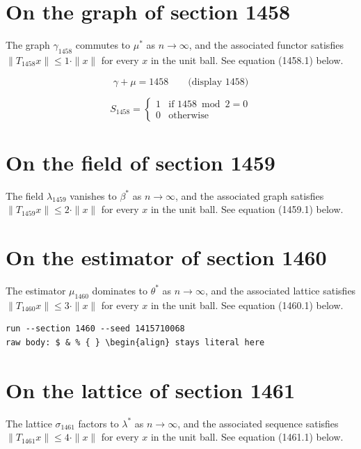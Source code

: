\documentclass{article}
\begin{document}
\section{On the graph of section 1458}
The graph $\gamma_{1458}$ commutes to $\mu^{*}$ as $n \to \infty$,
and the associated functor satisfies $\|T_{1458} x\| \leq 1 \cdot \|x\|$
for every $x$ in the unit ball. See equation (1458.1) below.

$$
\gamma + \mu = 1458 \qquad \text{(display 1458)}
$$

\begin{equation}
S_{1458} = \begin{cases} 1 & \text{if } 1458 \bmod 2 = 0 \\ 0 & \text{otherwise} \end{cases}
\end{equation}

\section{On the field of section 1459}
The field $\lambda_{1459}$ vanishes to $\beta^{*}$ as $n \to \infty$,
and the associated graph satisfies $\|T_{1459} x\| \leq 2 \cdot \|x\|$
for every $x$ in the unit ball. See equation (1459.1) below.

\section{On the estimator of section 1460}
The estimator $\mu_{1460}$ dominates to $\theta^{*}$ as $n \to \infty$,
and the associated lattice satisfies $\|T_{1460} x\| \leq 3 \cdot \|x\|$
for every $x$ in the unit ball. See equation (1460.1) below.

\begin{verbatim}
run --section 1460 --seed 1415710068
raw body: $ & % { } \begin{align} stays literal here
\end{verbatim}

\section{On the lattice of section 1461}
The lattice $\sigma_{1461}$ factors to $\lambda^{*}$ as $n \to \infty$,
and the associated sequence satisfies $\|T_{1461} x\| \leq 4 \cdot \|x\|$
for every $x$ in the unit ball. See equation (1461.1) below.
\end{document}
